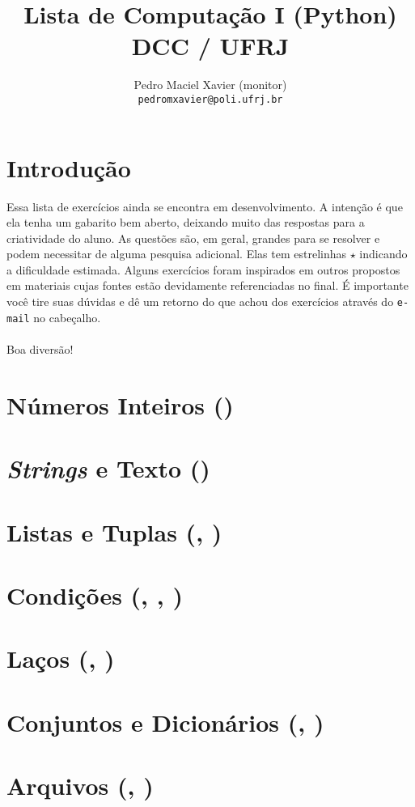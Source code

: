 \documentclass[12pt]{article}
\title{Lista de Computação I (Python) \\ {\normalsize DCC / UFRJ}}
\author{Pedro Maciel Xavier (monitor)\\ \texttt{pedromxavier@poli.ufrj.br}}
\begin{document}
	\maketitle
	\section*{Introdução}
	Essa lista de exercícios ainda se encontra em desenvolvimento. A intenção é que ela tenha um gabarito bem aberto, deixando muito das respostas para a criatividade do aluno. As questões são, em geral, grandes para se resolver e podem necessitar de alguma pesquisa adicional. Elas tem estrelinhas $\star$ indicando a dificuldade estimada. Alguns exercícios foram inspirados em outros propostos em materiais cujas fontes estão devidamente referenciadas no final. É importante você tire suas dúvidas e dê um retorno do que achou dos exercícios através do \texttt{e-mail} no cabeçalho.
	~\\
	~\\
	Boa diversão! \par
	\pagebreak
	
	
	\tableofcontents
	\pagebreak
	
	\section{Números Inteiros ()}
	
	\section{\textit{Strings} e Texto ()}
	
	\section{Listas e Tuplas (, )}
	
	\section{Condições (, , )}
	
	\section{Laços (, )}
	
	\section{Conjuntos e Dicionários (, )}
	
	\section{Arquivos (, )}
	
	
\end{document}
